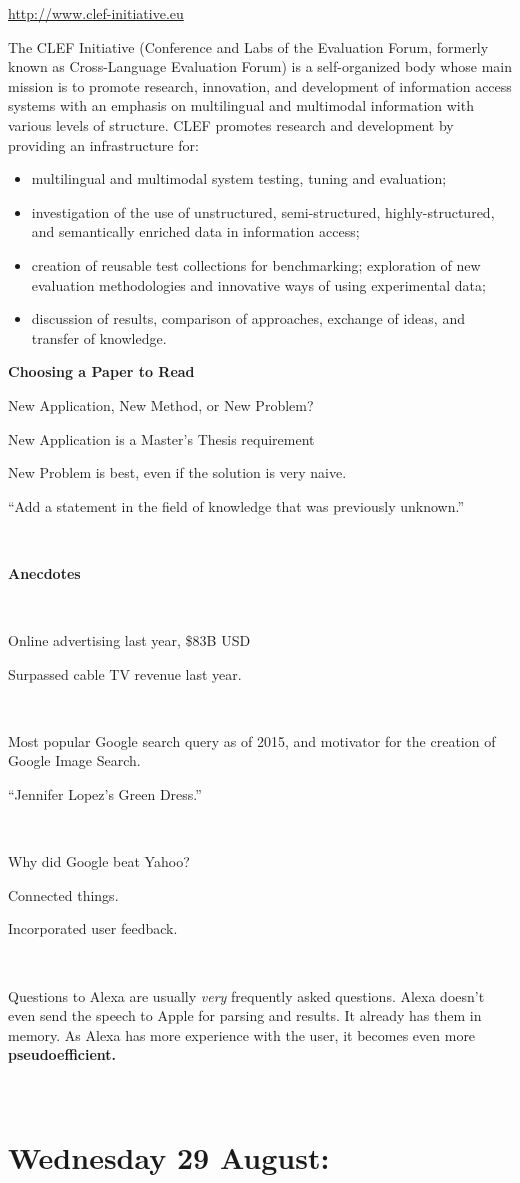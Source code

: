 \documentclass[11pt]{article}
\begin{document}
\begin{spacing}{1.2}
\url{http://www.clef-initiative.eu}

The CLEF Initiative (Conference and Labs of the Evaluation Forum, formerly known as Cross-Language Evaluation Forum) is a self-organized body whose main mission is to promote research, innovation, and development of information access systems with an emphasis on multilingual and multimodal information with various levels of structure. CLEF promotes research and development by providing an infrastructure for:

\begin{itemize}
\item multilingual and multimodal system testing, tuning and evaluation;
\item investigation of the use of unstructured, semi-structured, highly-structured, and semantically enriched data in information access;
\item creation of reusable test collections for benchmarking;
exploration of new evaluation methodologies and innovative ways of using experimental data;
\item discussion of results, comparison of approaches, exchange of ideas, and transfer of knowledge.
\end{itemize}

{\bf Choosing a Paper to Read}

New Application, New Method, or New Problem?

New Application is a Master's Thesis requirement

New Problem is best, even if the solution is very naive.  

``Add a statement in the field of knowledge that was previously unknown.''

\

{\bf Anecdotes}

\

Online advertising last year, \$83B USD

Surpassed cable TV revenue last year.  

\

Most popular Google search query as of 2015, and motivator for the creation of Google Image Search.  

``Jennifer Lopez's Green Dress.''

\

Why did Google beat Yahoo?

Connected things.  

Incorporated user feedback.  

\

Questions to Alexa are usually {\it very} frequently asked questions.  Alexa doesn't even send the speech to Apple for parsing and results.  It already has them in memory.  As Alexa has more experience with the user, it becomes even more {\bf pseudoefficient.}

\

\section{Wednesday 29 August:  }


\end{spacing}
\end{document}
